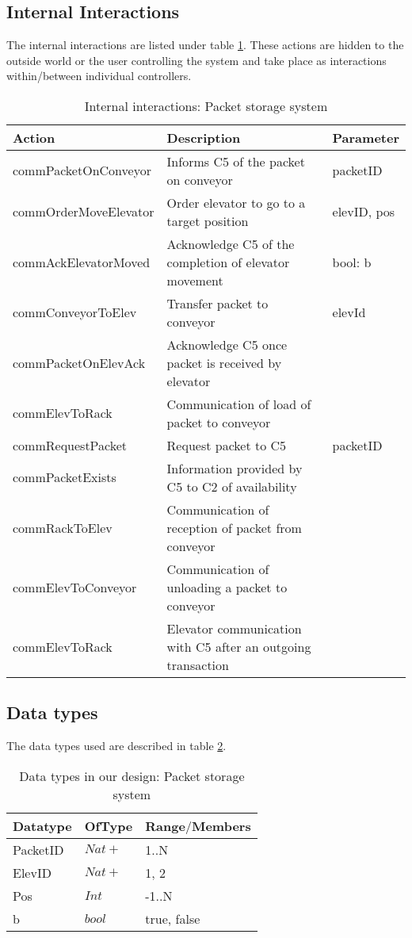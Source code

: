 \subsection*{Internal Interactions}
The internal interactions are listed under table \ref{tab: int_interactions}. These actions are hidden to the outside world or the user controlling the system and take place as interactions within/between individual controllers.
\begin{table}[ht]
\centering
\begin{tabular}{|l|l|l|}\hline
Action & Description & Parameter \\\hline
commPacketOnConveyor & Informs C5 of the packet on conveyor & packetID \\\hline 
commOrderMoveElevator & Order elevator to go to a target position & elevID, pos \\\hline
commAckElevatorMoved & Acknowledge C5 of the completion of elevator movement & bool: b \\\hline
commConveyorToElev & Transfer packet to conveyor & elevId \\\hline
commPacketOnElevAck & Acknowledge C5 once packet is received by elevator & \\\hline
commElevToRack  & Communication of load of packet to conveyor &\\\hline
commRequestPacket & Request packet to C5 & packetID \\\hline
commPacketExists & Information provided by C5 to C2 of availability & \\\hline
commRackToElev & Communication of reception of packet from conveyor & \\\hline
commElevToConveyor & Communication of unloading a packet to conveyor & \\\hline
commElevToRack & Elevator communication with C5 after an outgoing transaction & \\\hline
\end{tabular}
\caption{Internal interactions: Packet storage system }
\label{tab: int_interactions}
\end{table}

\subsection*{Data types}
The data types used are described in table \ref{tab: data_types}.
\begin{table}[ht]
\centering
\begin{tabular}{|l|l|l|}\hline
Datatype & OfType & Range$\slash$Members\\\hline
PacketID & $Nat+$ & {1..N} \\\hline
ElevID & $Nat+$ & {1, 2}\\\hline
Pos & $Int$ & {-1..N}\\\hline
b & $bool$ & {true, false} \\\hline
\end{tabular}
\caption{Data types in our design: Packet storage system }
\label{tab: data_types}
\end{table}



